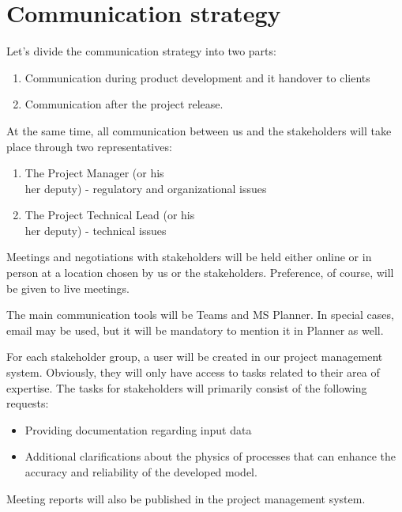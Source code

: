 \section{Communication strategy}\label{sec:communication-strategy}

Let's divide the communication strategy into two parts:

\begin{enumerate}
    \item Communication during product development and it handover to clients


    \item Communication after the project release.


\end{enumerate}
At the same time, all communication between us and the stakeholders will take place through two representatives:

\begin{enumerate}
    \item The Project Manager (or his\\her deputy) - regulatory and organizational issues


    \item The Project Technical Lead (or his\\her deputy) - technical issues


\end{enumerate}
Meetings and negotiations with stakeholders will be held either online or in person at a location chosen by us or the stakeholders.
Preference, of course, will be given to live meetings.

The main communication tools will be Teams and MS Planner.
In special cases, email may be used, but it will be mandatory to mention it in Planner as well.

For each stakeholder group, a user will be created in our project management system.
Obviously, they will only have access to tasks related to their area of expertise.
The tasks for stakeholders will primarily consist of the following requests:

\begin{itemize}
    \item Providing documentation regarding input data


    \item Additional clarifications about the physics of processes that can enhance the accuracy and reliability of the developed model.


\end{itemize}
Meeting reports will also be published in the project management system.

